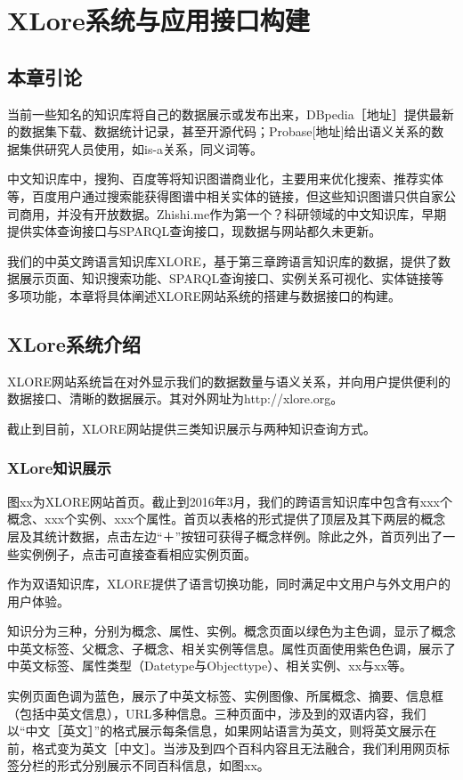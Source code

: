 \chapter{XLore系统与应用接口构建}
\label{cha:intro}

\section{本章引论}
当前一些知名的知识库将自己的数据展示或发布出来，DBpedia［地址］提供最新的数据集下载、数据统计记录，甚至开源代码；Probase[地址]给出语义关系的数据集供研究人员使用，如is-a关系，同义词等。

中文知识库中，搜狗、百度等将知识图谱商业化，主要用来优化搜索、推荐实体等，百度用户通过搜索能获得图谱中相关实体的链接，但这些知识图谱只供自家公司商用，并没有开放数据。Zhishi.me作为第一个？科研领域的中文知识库，早期提供实体查询接口与SPARQL查询接口，现数据与网站都久未更新。

我们的中英文跨语言知识库XLORE，基于第三章跨语言知识库的数据，提供了数据展示页面、知识搜索功能、SPARQL查询接口、实例关系可视化、实体链接等多项功能，本章将具体阐述XLORE网站系统的搭建与数据接口的构建。

\section{XLore系统介绍}
XLORE网站系统旨在对外显示我们的数据数量与语义关系，并向用户提供便利的数据接口、清晰的数据展示。其对外网址为http://xlore.org。

截止到目前，XLORE网站提供三类知识展示与两种知识查询方式。

\subsection{XLore知识展示}
图xx为XLORE网站首页。截止到2016年3月，我们的跨语言知识库中包含有xxx个概念、xxx个实例、xxx个属性。首页以表格的形式提供了顶层及其下两层的概念层及其统计数据，点击左边“＋”按钮可获得子概念样例。除此之外，首页列出了一些实例例子，点击可直接查看相应实例页面。

作为双语知识库，XLORE提供了语言切换功能，同时满足中文用户与外文用户的用户体验。

知识分为三种，分别为概念、属性、实例。概念页面以绿色为主色调，显示了概念中英文标签、父概念、子概念、相关实例等信息。属性页面使用紫色色调，展示了中英文标签、属性类型（Datetype与Objecttype）、相关实例、xx与xx等。

实例页面色调为蓝色，展示了中英文标签、实例图像、所属概念、摘要、信息框（包括中英文信息），URL多种信息。三种页面中，涉及到的双语内容，我们以“中文［英文］”的格式展示每条信息，如果网站语言为英文，则将英文展示在前，格式变为英文［中文］。当涉及到四个百科内容且无法融合，我们利用网页标签分栏的形式分别展示不同百科信息，如图xx。

